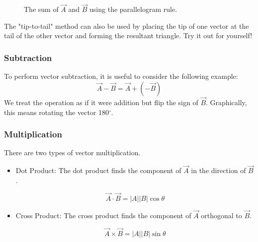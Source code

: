\documentclass[a4paper, 11pt]{book}
\begin{document}
\begin{figure}[h]
\centering
{}
\caption{The sum of $\vec{A}$ and {$\vec{B}$ using the parallelogram rule.}}
\end{figure}

\noindent The "tip-to-tail" method can also be used by placing the tip of one vector at the tail of the other vector
and forming the resultant triangle. Try it out for yourself! 

\subsubsection{Subtraction}
To perform vector subtraction, it is useful to consider the following example:
\[
\vec{A} - \vec{B} = \vec{A} + (-\vec{B})
\]
We treat the operation as if it were addition but flip the sign of $\vec{B}$. Graphically, this means rotating the 
vector 180$^{\circ}$.

\subsubsection{Multiplication}
There are two types of vector multiplication. 

\begin{itemize}
	\item Dot Product:
		The dot product finds the component of $\vec{A}$ in the direction of $\vec{B}$. 
		
        \begin{equation}
        \label{eq:dotproduct}
        \vec{A} \cdot \vec{B} = |A||B|\cos\theta
        \end{equation}

	\item Cross Product:
        The cross product finds the component of $\vec{A}$ orthogonal to $\vec{B}$. 
        
        \begin{equation}
        \label{eq:crossproduct}
        \vec{A} \times \vec{B} = |A||B|\sin\theta
        \end{equation}

\end{itemize}
\end{document}
